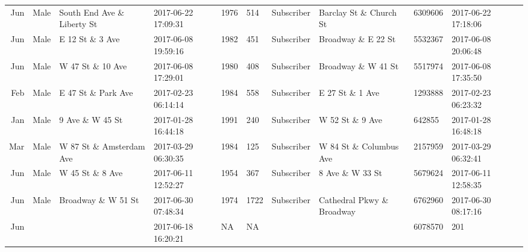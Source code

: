 \documentclass[11pt]{article}
\begin{document}
\begin{tabular}{r|llllllllll}
	 Jun                           & Male                          & South End Ave \& Liberty St  & 2017-06-22 17:09:31           & 1976                          &  514                          & Subscriber                    & Barclay St \& Church St      & 6309606                       & 2017-06-22 17:18:06          \\
	 Jun                           & Male                          & E 12 St \& 3 Ave             & 2017-06-08 19:59:16           & 1982                          &  451                          & Subscriber                    & Broadway \& E 22 St          & 5532367                       & 2017-06-08 20:06:48          \\
	 Jun                           & Male                          & W 47 St \& 10 Ave            & 2017-06-08 17:29:01           & 1980                          &  408                          & Subscriber                    & Broadway \& W 41 St          & 5517974                       & 2017-06-08 17:35:50          \\
	 Feb                           & Male                          & E 47 St \& Park Ave          & 2017-02-23 06:14:14           & 1984                          &  558                          & Subscriber                    & E 27 St \& 1 Ave             & 1293888                       & 2017-02-23 06:23:32          \\
	 Jan                           & Male                          & 9 Ave \& W 45 St             & 2017-01-28 16:44:18           & 1991                          &  240                          & Subscriber                    & W 52 St \& 9 Ave             &  642855                       & 2017-01-28 16:48:18          \\
	 Mar                           & Male                          & W 87 St  \& Amsterdam Ave    & 2017-03-29 06:30:35           & 1984                          &  125                          & Subscriber                    & W 84 St \& Columbus Ave      & 2157959                       & 2017-03-29 06:32:41          \\
	 Jun                           & Male                          & W 45 St \& 8 Ave             & 2017-06-11 12:52:27           & 1954                          &  367                          & Subscriber                    & 8 Ave \& W 33 St             & 5679624                       & 2017-06-11 12:58:35          \\
	 Jun                           & Male                          & Broadway \& W 51 St          & 2017-06-30 07:48:34           & 1974                          & 1722                          & Subscriber                    & Cathedral Pkwy \& Broadway   & 6762960                       & 2017-06-30 08:17:16          \\
	 Jun                         &                             &                             & 2017-06-18 16:20:21         &   NA                        &   NA                        &                             &                             & 6078570                     & 201                        \\
\end{tabular}
\end{document}
